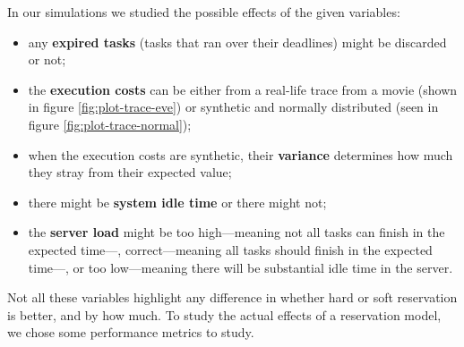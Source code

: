 \documentclass[times, 10pt,twocolumn]{article}
\begin{document}
\label{sec:controled-variables}

In our simulations we studied the possible effects of the given
variables:
\begin{itemize}
\item any \textbf{expired tasks} (tasks that ran over their deadlines)
  might be discarded or not;
\item the \textbf{execution costs} can be either from a real-life
  trace from a movie (shown in figure \ref{fig:plot-trace-eve}) or
  synthetic and normally distributed (seen in figure
  \ref{fig:plot-trace-normal});
\item when the execution costs are synthetic, their \textbf{variance}
  determines how much they stray from their expected value;
\item there might be \textbf{system idle time} or there might not;
\item the \textbf{server load} might be too high---meaning not all
  tasks can finish in the expected time---, correct---meaning all
  tasks should finish in the expected time---, or too low---meaning
  there will be substantial idle time in the server.
\end{itemize}

Not all these variables highlight any difference in whether hard or
soft reservation is better, and by how much. To study the actual
effects of a reservation model, we chose some performance metrics to study.

\label{sec:metrics}
\end{document}
